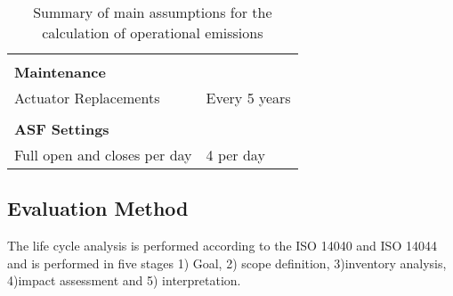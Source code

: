 \begin{table}[H]
\begin{tabular}{ll}
                              &                                                \\
\textbf{Maintenance}          &                                                \\
Actuator Replacements         & Every 5 years                                  \\
                              &                                                \\
\textbf{ASF Settings}         &                                                \\
Full open and closes per day  & 4 per day                                      \\
\hline
\end{tabular}
\caption{Summary of main assumptions for the calculation of operational emissions}
\label{tab:AssumptionsOpp}
\end{table}



\subsection{Evaluation Method}
The life cycle analysis is performed according to the ISO 14040 and ISO 14044 and is performed in five stages 1) Goal, 2) scope definition, 3)inventory analysis, 4)impact assessment and 5) interpretation.\\ %

